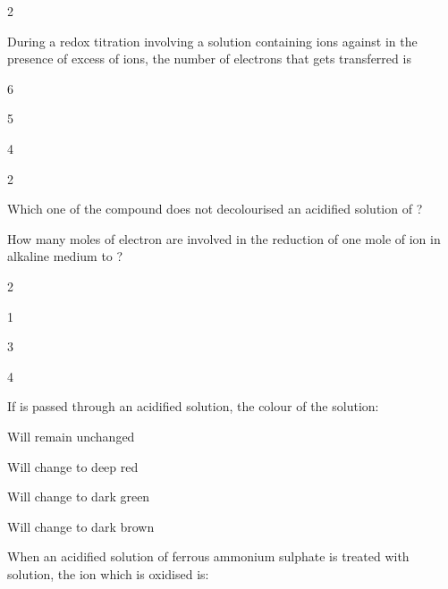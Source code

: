 \documentclass[10pt,a4paper]{article}
\begin{document}
\begin{multicols}{2}
\begin{questions}[start=119]

\item During a redox titration involving a solution containing  ions against  in the presence of excess of  ions, the number of electrons that gets transferred is
\begin{options}
  \item 6
  \item 5
  \item 4
  \item 2
\end{options}

\item Which one of the compound does not decolourised an acidified solution of ?
\begin{options}
  \item {}
  \item {}
  \item {}
  \item {}
\end{options}

\item How many moles of electron are involved in the reduction of one mole of  ion in alkaline medium to ?
\begin{options}
  \item 2
  \item 1
  \item 3
  \item 4
\end{options}

\item If  is passed through an acidified  solution, the colour of the solution:
\begin{options}
  \item Will remain unchanged
  \item Will change to deep red
  \item Will change to dark green
  \item Will change to dark brown
\end{options}

\item When an acidified solution of ferrous ammonium sulphate is treated with  solution, the ion which is oxidised is:
\begin{options}
  \item {}
  \item {}
  \item {}
  \item {}
\end{options}


\end{questions}
\end{multicols}
\end{document}
